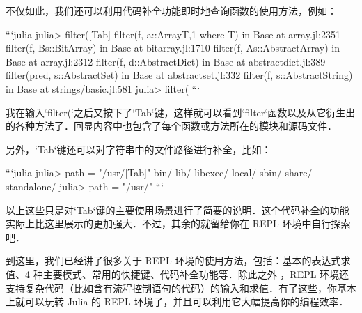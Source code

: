 不仅如此，我们还可以利用代码补全功能即时地查询函数的使用方法，例如：

```julia
julia> filter([Tab]
filter(f, a::Array{T,1} where T) in Base at array.jl:2351
filter(f, Bs::BitArray) in Base at bitarray.jl:1710
filter(f, As::AbstractArray) in Base at array.jl:2312
filter(f, d::AbstractDict) in Base at abstractdict.jl:389
filter(pred, s::AbstractSet) in Base at abstractset.jl:332
filter(f, s::AbstractString) in Base at strings/basic.jl:581
julia> filter(
```

我在输入`filter(`之后又按下了`Tab`键，这样就可以看到`filter`函数以及从它衍生出的各种方法了．回显内容中也包含了每个函数或方法所在的模块和源码文件．

另外，`Tab`键还可以对字符串中的文件路径进行补全，比如：

```julia
julia> path = "/usr/[Tab]"
bin/        lib/         libexec/     local/       sbin/        share/       standalone/
julia> path = "/usr/"
```

以上这些只是对`Tab`键的主要使用场景进行了简要的说明．这个代码补全的功能实际上比这里展示的更加强大．不过，其余的就留给你在 REPL 环境中自行探索吧．

到这里，我们已经讲了很多关于 REPL 环境的使用方法，包括：基本的表达式求值、4 种主要模式、常用的快捷键、代码补全功能等．除此之外 ，REPL 环境还支持复杂代码（比如含有流程控制语句的代码）的输入和求值．有了这些，你基本上就可以玩转 Julia 的 REPL 环境了，并且可以利用它大幅提高你的编程效率．